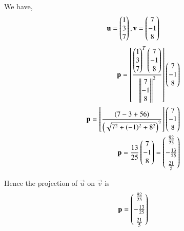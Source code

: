 
We have, $$\mathbf{u}= \begin{pmatrix}1 \\ 3 \\ 7\end{pmatrix},\mathbf{v}= \begin{pmatrix}7 \\ -1 \\ 8\end{pmatrix}$$
\begin{align}
 \mathbf{p}=\left[\frac{\begin{pmatrix}1 \\ 3 \\ 7\end{pmatrix}^T\begin{pmatrix}7 \\ -1 \\ 8\end{pmatrix}}{{\left\lVert\begin{matrix}7 \\ -1 \\ 8\end{matrix}\right\rVert}^2}\right] \begin{pmatrix}7 \\ -1 \\ 8\end{pmatrix}\\
\mathbf{p}=\left[\frac{(7-3+56)}{\left(\sqrt{7^2+(-1)^2+8^2}\right)^2}\right]\begin{pmatrix}7 \\ -1 \\ 8\end{pmatrix}\\
\mathbf{p}=\frac{13}{25} \begin{pmatrix}7 \\ -1 \\ 8\end{pmatrix}= \begin{pmatrix}\frac{92}{25} \\[0.2cm] -\frac{13}{25} \\[0.2cm] \frac{21}{5}\end{pmatrix}
\end{align}

Hence the projection of $\vec{u}$ on $\vec{v}$ is $$\mathbf{p}=\begin{pmatrix}\frac{92}{25} \\[0.2cm] -\frac{13}{25} \\[0.2cm] \frac{21}{5}\end{pmatrix}$$



